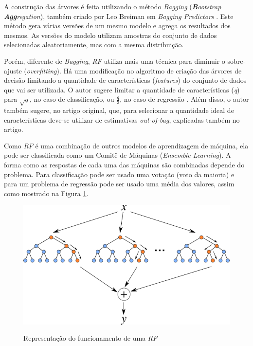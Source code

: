 A construção das árvores é feita utilizando o método \textit{Bagging} (\textit{\textbf{B}ootstrap \textbf{Agg}regation}), também criado por Leo Breiman em \textit{Bagging Predictors} \cite{Breiman:1996:BP:231986.231989}. Este método gera várias versões de um mesmo modelo e agrega os resultados dos mesmos. As versões do modelo utilizam amostras do conjunto de dados selecionadas aleatoriamente, mas com a mesma distribuição.

Porém, diferente de \textit{Bagging}, \textit{\acrshort{RF}} utiliza mais uma técnica para diminuir o sobre-ajuste (\textit{overfitting}). Há uma modificação no algoritmo de criação das árvores de decisão limitando a quantidade de características (\textit{features}) do conjunto de dados que vai ser utilizada. O autor sugere limitar a quantidade de características (\textit{q}) para $ \sqrt{q} $, no caso de classificação, ou $ \frac{q}{3} $, no caso de regressão \cite{hastie2005elements}. Além disso, o autor também sugere, no artigo original, que, para selecionar a quantidade ideal de características deve-se utilizar de estimativas \textit{out-of-bag}, explicadas também no artigo.

Como \textit{\acrshort{RF}} é uma combinação de outros modelos de aprendizagem de máquina, ela pode ser classificada como um Comitê de Máquinas (\textit{Ensemble Learning}). A forma como as respostas de cada uma das máquinas são combinadas depende do problema. Para classificação pode ser usado uma votação (voto da maioria) e para um problema de regressão pode ser usado uma média dos valores, assim como mostrado na Figura \ref{figure:random_forest}.

\begin{figure}[htbp]
    \centering
    \includegraphics[scale=1.0]{monography/img/models/random_forest.png}
    \label{figure:random_forest}
    \caption[Representação do funcionamento de uma \textit{\acrshort{RF}}]{Representação do funcionamento de uma \textit{\acrshort{RF}}\footnotemark}
\end{figure}

